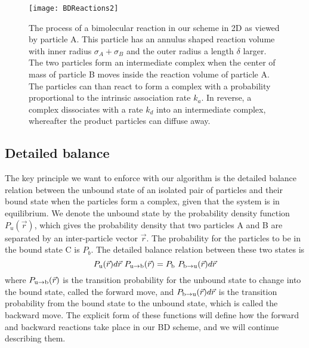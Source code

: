 \begin{figure}[ht]
\centering
\texttt{[image: BDReactions2]}
\caption{ The process of a bimolecular reaction in our scheme in 2D as viewed by particle A. This particle has an annulus shaped reaction volume with inner radius $\sigma_A + \sigma_B$ and the outer radius a length $\delta$ larger. The two particles form an intermediate complex when the center of mass of particle B moves inside the reaction volume of particle A. The particles can than react to form a complex with a probability proportional to the intrinsic association rate $k_a$. In reverse, a complex dissociates with a rate $k_d$ into an intermediate complex, whereafter the product particles can diffuse away.}
\end{figure}
 
\subsection{Detailed balance}

The key principle we want to enforce with our algorithm is the detailed balance relation between the unbound state of an isolated pair of particles and their bound state when the particles form a complex, given that the system is in equilibrium. We denote the unbound state by the probability density function $P_u(\vec{r})$, which gives the probability density that two particles A and B are separated by an inter-particle vector $\vec{r}$. The probability for the particles to be in the bound state C is $P_b$. The detailed balance relation between these two states is
\begin{equation}
 P_{ \rm{u} }(\vec{r})d\vec{r} \,\, P_{ \rm{u} \to \rm{b} }(\vec{r}) = P_{ \rm{b} } \,\, P_{ \rm{b} \to \rm{u} }(\vec{r})d\vec{r}
\elabel{DBeqn}
\end{equation}
where $P_{ \rm{u} \to \rm{b} }(\vec{r})$ is the transition probability for the unbound state to change into the bound state, called the forward move, and $P_{ \rm{b} \to \rm{u}}(\vec{r})d\vec{r}$ is the transition probability from the bound state to the unbound state, which is called the backward move. The explicit form of these functions will define how the forward and backward reactions take place in our BD scheme, and we will continue describing them. 

